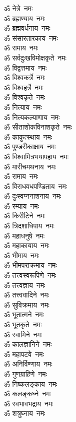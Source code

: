 \begin{multicols}{2}
\begin{flushleft}
ॐ नेत्रे~नमः\hfill{}\\
ॐ ब्रह्मण्याय~नमः\\
ॐ ब्रह्मवर्धनाय~नमः\\
ॐ संसारतारकाय~नमः\\
ॐ रामाय~नमः\\
ॐ सर्वदुःखविमोक्षकृते~नमः\\
ॐ विद्वत्तमाय~नमः\\
ॐ विश्वकर्त्रे~नमः\\
ॐ विश्वहर्त्रे~नमः\\
ॐ विश्वकृते~नमः\\
ॐ नित्याय~नमः\hfill{}\\
ॐ नित्यकल्याणाय~नमः\\
ॐ सीताशोकविनाशकृते~नमः\\
ॐ काकुत्स्थाय~नमः\\
ॐ पुण्डरीकाक्षाय~नमः\\
ॐ विश्वामित्रभयापहाय~नमः\\
ॐ मारीचमथनाय~नमः\\
ॐ रामाय~नमः\\
ॐ विराधवधपण्डिताय~नमः\\
ॐ दुःस्वप्ननाशनाय~नमः\\
ॐ रम्याय~नमः\hfill{}\\
ॐ किरीटिने~नमः\\
ॐ त्रिदशाधिपाय~नमः\\
ॐ महाधनुषे~नमः\\
ॐ महाकायाय~नमः\\
ॐ भीमाय~नमः\\
ॐ भीमपराक्रमाय~नमः\\
ॐ तत्त्वस्वरूपिणे~नमः\\
ॐ तत्त्वज्ञाय~नमः\\
ॐ तत्त्ववादिने~नमः\\
ॐ सुविक्रमाय~नमः\hfill{}\\
ॐ भूतात्मने~नमः\\
ॐ भूतकृते~नमः\\
ॐ स्वामिने~नमः\\
ॐ कालज्ञानिने~नमः\\
ॐ महापटवे~नमः\\
ॐ अनिर्विण्णाय~नमः\\
ॐ गुणग्राहिणे~नमः\\
ॐ निष्कलङ्काय~नमः\\
ॐ कलङ्कघ्ने~नमः\\
ॐ स्वभावभद्राय~नमः\hfill{}\\
ॐ शत्रुघ्नाय~नमः\\

\end{flushleft}
\end{multicols}
